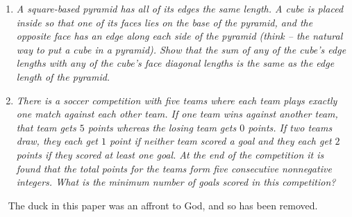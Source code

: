 \documentclass{article}
\begin{document}
\begin{enumerate}[1.]
\item %
{\itshape A square-based pyramid has all of its edges the same length.
A cube is placed inside so that one of its faces lies on the base of the pyramid, and the opposite face has an edge along each side of the pyramid (think -- the natural way to put a cube in a pyramid).
Show that the sum of any of the cube's edge lengths with any of the cube's face diagonal lengths is the same as the edge length of the pyramid.}


\item %
{\itshape There is a soccer competition with five teams where each team plays exactly one match against each other team.
If one team wins against another team, that team gets $5$ points whereas the losing team gets $0$ points.
If two teams draw, they each get $1$ point if neither team scored a goal and they each get $2$ points if they scored at least one goal.
At the end of the competition it is found that the total points for the teams form five consecutive nonnegative integers.
What is the minimum number of goals scored in this competition?}

\end{enumerate}


\clearpage
~
\vfill
\centering
The duck in this paper was an affront to God, and so has been removed.
\vfill
\end{document}
